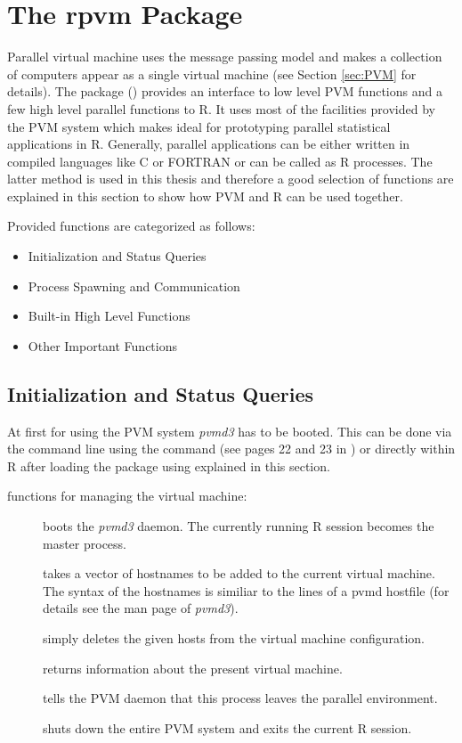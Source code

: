 \section{The rpvm Package}
\label{sec:rpvm}
Parallel virtual machine uses the message passing model and makes a
collection of computers appear as a single virtual machine (see Section
\ref{sec:PVM} for details).
The package  (\cite{nali07rpvm}) provides an interface to
low level PVM functions and
a few high level parallel functions to R. It uses most of the
facilities provided by the PVM system which makes  ideal for
prototyping parallel statistical applications in R. Generally, parallel
applications can be either written in compiled languages like C or
FORTRAN or can be called as R processes. The latter method is used in
this thesis and therefore a good selection of 
functions are explained in this section to show how PVM and R can be
used together.

Provided functions are categorized as follows:

\begin{itemize}
\item Initialization and Status Queries
\item Process Spawning and Communication
\item Built-in High Level Functions
\item Other Important Functions
\end{itemize}  

\subsection{Initialization and Status Queries}

At first for using the PVM system \textit{pvmd3} has to be
booted. This can be done via the command line using the 
command (see pages 22 and 23 in \cite{geist94pvm}) or directly within
R after loading the  package using 
explained in this section.

 functions for managing the virtual machine:

\begin{description}
\item[] boots the \textit{pvmd3} daemon. The
  currently running R session becomes the master process. 
\item[] takes a vector of hostnames to
  be added to the current virtual machine. The syntax of the
  hostnames is similiar to the lines of a pvmd hostfile (for details
  see the man page of \textit{pvmd3}). 
\item[] simply deletes the given hosts from
  the virtual machine configuration.
\item[] returns information about the present
  virtual machine.
\item[] tells the PVM daemon that this process
  leaves the parallel environment.
\item[] shuts down the entire PVM system and exits
  the current R session.
\end{description}
  
